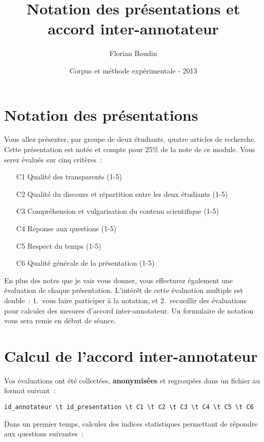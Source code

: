 \documentclass[12pt,a4paper]{article}
\begin{document}
\title{Notation des présentations et accord inter-annotateur}
\author{Florian Boudin}
\date{Corpus et méthode expérimentale - 2013}

\maketitle

\section*{Notation des présentations}

Vous allez présenter, par groupe de deux étudiants, quatre articles de recherche.
Cette présentation est notée et compte pour 25\% de la note de ce module.
Vous serez évalués sur cinq critères~:

\begin{enumerate}
    \item[C1] Qualité des transparents (1-5)
    \item[C2] Qualité du discours et répartition entre les deux étudiants (1-5)
    \item[C3] Compréhension et vulgarisation du contenu scientifique (1-5)
    \item[C4] Réponse aux questions (1-5)
    \item[C5] Respect du temps (1-5)
    \item[C6] Qualité générale de la présentation (1-5)
\end{enumerate}

En plus des notes que je vais vous donner, vous effecturez également une évaluation de chaque présentation.
L'intérêt de cette évaluation multiple est double~: 1.~vous faire participer à la notation, et 2.~recueillir des évaluations pour calculer des mesures d'accord inter-annotateur.
Un formulaire de notation vous sera remis en début de séance.

\section*{Calcul de l'accord inter-annotateur}

Vos évaluations ont été collectées, \textbf{anonymisées} et regroupées dans un fichier au format suivant~:

\begin{verbatim}
id_annotateur \t id_presentation \t C1 \t C2 \t C3 \t C4 \t C5 \t C6
\end{verbatim}

Dans un premier temps, calculez des indices statistiques permettant de répondre aux questions suivantes~:
\end{document}
